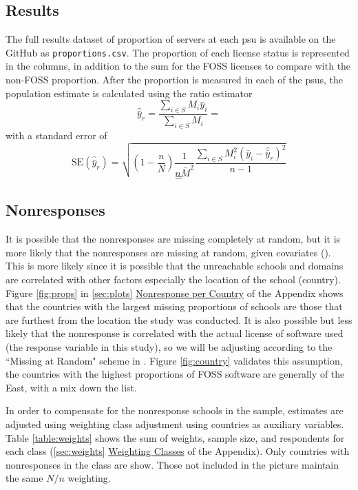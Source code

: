 \documentclass{article}
\theoremstyle{definition}
\begin{document}
\begin{flushleft}
\begin{multicols}{2}
\section{Results}
The full results dataset of proportion of servers at
each psu is available on the GitHub as \texttt{proportions.csv}.
The proportion of each license status is represented in the columns,
in addition to the sum for the FOSS licenses to compare with the
non-FOSS proportion. After the proportion is measured in each of
the psus, the population estimate is calculated using the
ratio estimator
$$
	\hat{\bar{y}}_r
	=
	\frac{
		\sum_{i \in S} M_i\bar{y}_i
	}{
		\sum_{i \in S} M_i
	}
	=
$$
with a standard error of
$$
	\textrm{SE}(\hat{\bar{y}}_r)
	=
	\sqrt{
		\left(
			1 - \frac{n}{N}
		\right)
		\frac{1}{n\bar{M}^2}
		\frac{
			\sum_{i \in S}M_i^2\left(\bar{y}_i-\hat{\bar{y}}_r\right)^2
		}{
			n-1
		}
	}
$$
$$
=
$$

\subsection{Nonresponses}
It is possible that the nonresponses are missing completely at random,
but it is more likely that the nonresponses are missing at random, given
covariates (\cite{lohr2019}). This is more likely since it is possible that
the unreachable schools and domains are correlated with other factors especially
the location of the school (country). Figure \ref{fig:props} in \autoref{sec:plots}
\hyperref[sec:plots]{Nonresponse per Country}
of the Appendix shows that the countries with the largest missing proportions
of schools are those that are furthest from the location the study was conducted.
It is also possible but less likely that
the nonresponse is correlated with the actual license of software used (the
response variable in this study), so we will be adjusting according to
the ``Missing at Random" scheme in \cite{lohr2019}. Figure \ref{fig:country}
validates this assumption, the countries with the highest proportions of
FOSS software are generally of the East, with a mix down the list.

In order to compensate for the nonresponse schools
in the sample, estimates are adjusted using weighting
class adjustment using countries as auxiliary variables. Table
\ref{table:weights} shows the
sum of weights, sample size, and respondents for each class
(\autoref{sec:weights} \hyperref[sec:weights]{Weighting Classes} of
the Appendix).
Only countries with nonresponses in the class are show.
Those not included in the picture maintain the same $N/n$ weighting.


\end{multicols}
\end{flushleft}
\end{document}

